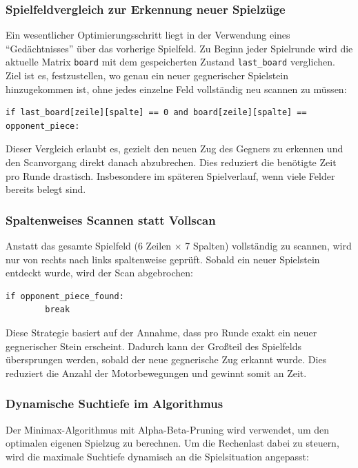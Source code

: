 \subsubsection{Spielfeldvergleich zur Erkennung neuer Spielzüge}

Ein wesentlicher Optimierungsschritt liegt in der Verwendung eines ``Gedächtnisses'' über das vorherige Spielfeld. Zu Beginn jeder Spielrunde wird die aktuelle Matrix \texttt{board} mit dem gespeicherten Zustand \texttt{last\_board} verglichen. Ziel ist es, festzustellen, wo genau ein neuer gegnerischer Spielstein hinzugekommen ist, ohne jedes einzelne Feld vollständig neu scannen zu müssen:

\begin{lstlisting}[style=pythonstyle]
	if last_board[zeile][spalte] == 0 and board[zeile][spalte] == opponent_piece:
\end{lstlisting}

Dieser Vergleich erlaubt es, gezielt den neuen Zug des Gegners zu erkennen und den Scanvorgang direkt danach abzubrechen. Dies reduziert die benötigte Zeit pro Runde drastisch. Insbesondere im späteren Spielverlauf, wenn viele Felder bereits belegt sind.

\subsubsection{Spaltenweises Scannen statt Vollscan}

Anstatt das gesamte Spielfeld (6 Zeilen × 7 Spalten) vollständig zu scannen, wird nur von rechts nach links spaltenweise geprüft. Sobald ein neuer Spielstein entdeckt wurde, wird der Scan abgebrochen:

\begin{lstlisting}[style=pythonstyle]
	if opponent_piece_found:
		break
\end{lstlisting}

Diese Strategie basiert auf der Annahme, dass pro Runde exakt ein neuer gegnerischer Stein erscheint. Dadurch kann der Großteil des Spielfelds übersprungen werden, sobald der neue gegnerische Zug erkannt wurde. Dies reduziert die Anzahl der Motorbewegungen und gewinnt somit an Zeit.

\subsubsection{Dynamische Suchtiefe im Algorithmus}

Der Minimax-Algorithmus mit Alpha-Beta-Pruning wird verwendet, um den optimalen eigenen Spielzug zu berechnen. Um die Rechenlast dabei zu steuern, wird die maximale Suchtiefe dynamisch an die Spielsituation angepasst:

